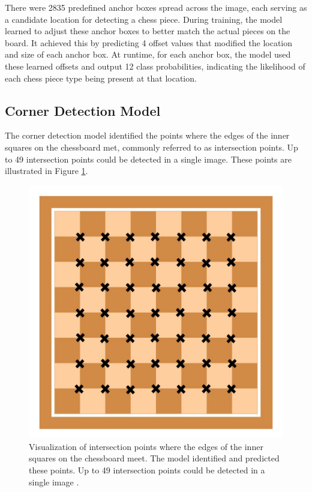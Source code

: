 There were 2835 predefined anchor boxes spread across the image, each serving as a candidate location for detecting a chess piece. During training, the model learned to adjust these anchor boxes to better match the actual pieces on the board. It achieved this by predicting 4 offset values that modified the location and size of each anchor box. At runtime, for each anchor box, the model used these learned offsets and output 12 class probabilities, indicating the likelihood of each chess piece type being present at that location.


\subsection{Corner Detection Model}
The corner detection model identified the points where the edges of the inner squares on the chessboard met, commonly referred to as intersection points. Up to 49 intersection points could be detected in a single image. These points are illustrated in Figure \ref{fig:xcorners-chessboard}.

\begin{figure}[h!]
    \centering
    \includegraphics[width=0.75\linewidth]{figures/methods/ml-models/xcorners_chessboard.jpg}
    \caption[Detected intersection points on chessboard]{Visualization of intersection points where the edges of the inner squares on the chessboard meet. The model identified and predicted these points. Up to 49 intersection points could be detected in a single image \cite{vectorstock:chessboard-svg}.}
    \label{fig:xcorners-chessboard}
\end{figure}

